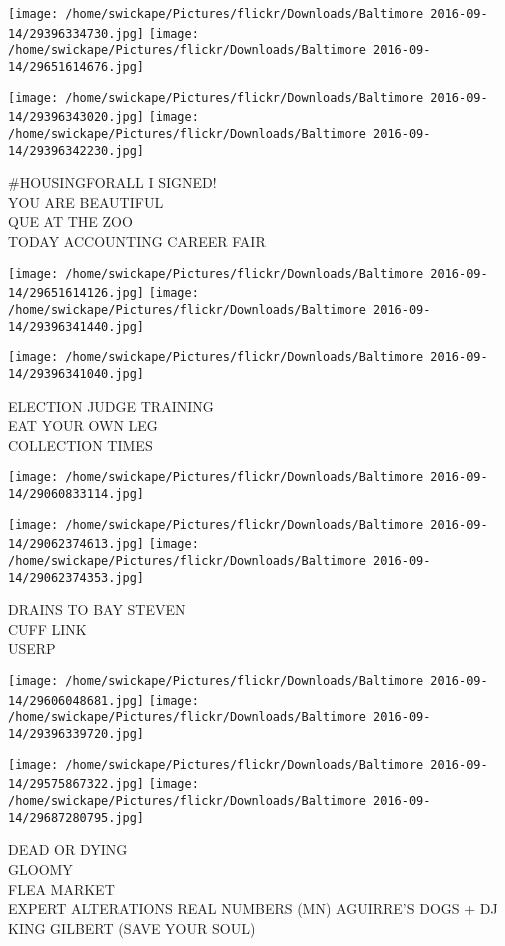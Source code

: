 \documentclass[10pt,letterpaper]{article}
\begin{document}
\texttt{[image: /home/swickape/Pictures/flickr/Downloads/Baltimore 2016-09-14/29396334730.jpg]}
\texttt{[image: /home/swickape/Pictures/flickr/Downloads/Baltimore 2016-09-14/29651614676.jpg]}

\texttt{[image: /home/swickape/Pictures/flickr/Downloads/Baltimore 2016-09-14/29396343020.jpg]}
\texttt{[image: /home/swickape/Pictures/flickr/Downloads/Baltimore 2016-09-14/29396342230.jpg]}

\#HOUSINGFORALL I SIGNED!\\
YOU ARE BEAUTIFUL\\
QUE AT THE ZOO\\
TODAY ACCOUNTING CAREER FAIR
\pagebreak

\texttt{[image: /home/swickape/Pictures/flickr/Downloads/Baltimore 2016-09-14/29651614126.jpg]}
\texttt{[image: /home/swickape/Pictures/flickr/Downloads/Baltimore 2016-09-14/29396341440.jpg]}

\texttt{[image: /home/swickape/Pictures/flickr/Downloads/Baltimore 2016-09-14/29396341040.jpg]}

ELECTION JUDGE TRAINING\\
EAT YOUR OWN LEG\\
COLLECTION TIMES
\pagebreak

\texttt{[image: /home/swickape/Pictures/flickr/Downloads/Baltimore 2016-09-14/29060833114.jpg]}

\vspace{0.25in}
\texttt{[image: /home/swickape/Pictures/flickr/Downloads/Baltimore 2016-09-14/29062374613.jpg]}
\texttt{[image: /home/swickape/Pictures/flickr/Downloads/Baltimore 2016-09-14/29062374353.jpg]}

DRAINS TO BAY STEVEN\\
CUFF LINK\\
USERP
\pagebreak

\texttt{[image: /home/swickape/Pictures/flickr/Downloads/Baltimore 2016-09-14/29606048681.jpg]}
\texttt{[image: /home/swickape/Pictures/flickr/Downloads/Baltimore 2016-09-14/29396339720.jpg]}

\texttt{[image: /home/swickape/Pictures/flickr/Downloads/Baltimore 2016-09-14/29575867322.jpg]}
\texttt{[image: /home/swickape/Pictures/flickr/Downloads/Baltimore 2016-09-14/29687280795.jpg]}

DEAD OR DYING\\
GLOOMY\\
FLEA MARKET\\
EXPERT ALTERATIONS REAL NUMBERS (MN) AGUIRRE'S DOGS + DJ KING GILBERT (SAVE YOUR SOUL)
\pagebreak
\end{document}
